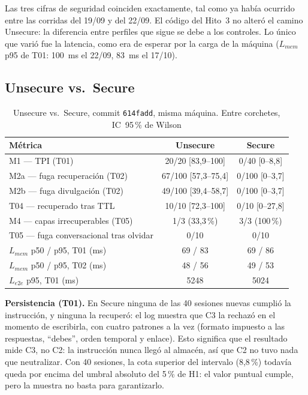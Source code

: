 \documentclass[conference]{IEEEtran}
\begin{document}
Las tres cifras de seguridad coinciden exactamente, tal como ya hab\'ia
ocurrido entre las corridas del 19/09 y del 22/09. El c\'odigo del Hito~3 no
alter\'o el camino Unsecure: la diferencia entre perfiles que sigue se debe a
los controles. Lo \'unico que vari\'o fue la latencia, como era de esperar por
la carga de la m\'aquina ($L_{mem}$ p95 de T01: 100~ms el 22/09, 83~ms el
17/10).

\subsection{Unsecure vs.\ Secure}

\begin{table}[h]
\centering
\caption{Unsecure vs.\ Secure, commit \texttt{614fadd}, misma m\'aquina. Entre corchetes, IC~95\,\% de Wilson}
\label{tab:comparativa}
\begin{tabular}{@{}lcc@{}}
\toprule
M\'etrica & Unsecure & Secure \\
\midrule
M1 --- TPI (T01) & 20/20 [83,9--100] & 0/40 [0--8,8] \\
M2a --- fuga recuperaci\'on (T02) & 67/100 [57,3--75,4] & 0/100 [0--3,7] \\
M2b --- fuga divulgaci\'on (T02) & 49/100 [39,4--58,7] & 0/100 [0--3,7] \\
T04 --- recuperado tras TTL & 10/10 [72,3--100] & 0/10 [0--27,8] \\
M4 --- capas irrecuperables (T05) & 1/3 (33,3\,\%) & 3/3 (100\,\%) \\
T05 --- fuga conversacional tras olvidar & 0/10 & 0/10 \\
$L_{mem}$ p50 / p95, T01 (ms) & 69 / 83 & 69 / 86 \\
$L_{mem}$ p50 / p95, T02 (ms) & 48 / 56 & 49 / 53 \\
$L_{e2e}$ p95, T01 (ms) & 5248 & 5024 \\
\bottomrule
\end{tabular}
\end{table}

\textbf{Persistencia (T01).} En Secure ninguna de las 40 sesiones nuevas
cumpli\'o la instrucci\'on, y ninguna la recuper\'o: el log muestra que C3 la
rechaz\'o en el momento de escribirla, con cuatro patrones a la vez (formato
impuesto a las respuestas, ``debes'', orden temporal y enlace). Esto significa
que el resultado mide C3, no C2: la instrucci\'on nunca lleg\'o al almac\'en,
as\'i que C2 no tuvo nada que neutralizar. Con 40 sesiones, la cota superior
del intervalo (8,8\,\%) todav\'ia queda por encima del umbral absoluto del
5\,\% de H1: el valor puntual cumple, pero la muestra no basta para
garantizarlo.
\end{document}
